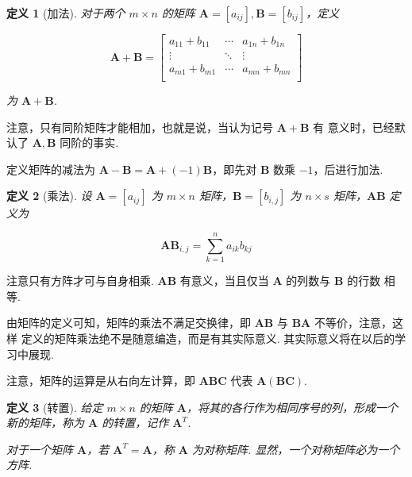 \documentclass[a4paper]{article}
\newtheorem{definition}{定义}[section]
\begin{document}
\begin{definition}[加法]
    对于两个 $m\times n$ 的矩阵 $\boldsymbol A=[a_{ij}],\boldsymbol B=[b_{ij}]$，定义

    \begin{equation*}
        \boldsymbol A+\boldsymbol B=\begin{bmatrix}
            a_{11}+b_{11} & \cdots & a_{1n}+b_{1n} \\
            \vdots        & \ddots & \vdots        \\
            a_{m1}+b_{m1} & \cdots & a_{mn}+b_{mn} \\
        \end{bmatrix}
    \end{equation*}

    为 $\boldsymbol A+\boldsymbol B$.
\end{definition}

注意，只有同阶矩阵才能相加，也就是说，当认为记号 $\boldsymbol A+\boldsymbol B$ 有
意义时，已经默认了 $\boldsymbol A,\boldsymbol B$ 同阶的事实.

定义矩阵的减法为 $\boldsymbol A-\boldsymbol B=\boldsymbol A+(-1)\boldsymbol B
$，即先对 $\boldsymbol B$ 数乘 $-1$，后进行加法.

\begin{definition}[乘法]
    设 $\boldsymbol A=[a_{ij}]$ 为 $m\times n$ 矩阵，$\boldsymbol B=[b_{i,j}]$ 为 $n\times s$ 矩阵，$\boldsymbol A\boldsymbol
        B$ 定义为

    \begin{equation*}
        \boldsymbol A\boldsymbol B_{i,j}=\sum\limits_{k=1}^n a_{ik}b_{kj}
    \end{equation*}
\end{definition}

注意只有方阵才可与自身相乘. $\boldsymbol A\boldsymbol B$ 有意义，当且仅当 $\boldsymbol A$ 的列数与 $\boldsymbol B$ 的行数
相等.

由矩阵的定义可知，矩阵的乘法不满足交换律，即 $\boldsymbol A\boldsymbol B$ 与 $\boldsymbol B\boldsymbol A$ 不等价，注意，这样
定义的矩阵乘法绝不是随意编造，而是有其实际意义. 其实际意义将在以后的学习中展现.

注意，矩阵的运算是从右向左计算，即 $\boldsymbol A\boldsymbol B\boldsymbol C$ 代表 $\boldsymbol A(\boldsymbol B \boldsymbol C)$.

\begin{definition}[转置]
    给定 $m\times n$ 的矩阵 $\boldsymbol A$，将其的各行作为相同序号的列，形成一个新的矩阵，称为 $\boldsymbol A$ 的转置，记作 $\boldsymbol A^T$.

    对于一个矩阵 $\boldsymbol A$，若 $\boldsymbol A^T=\boldsymbol A$，称 $\boldsymbol A$ 为对称矩阵. 显然，一个对称矩阵必为一个方阵.
\end{definition}
\end{document}
